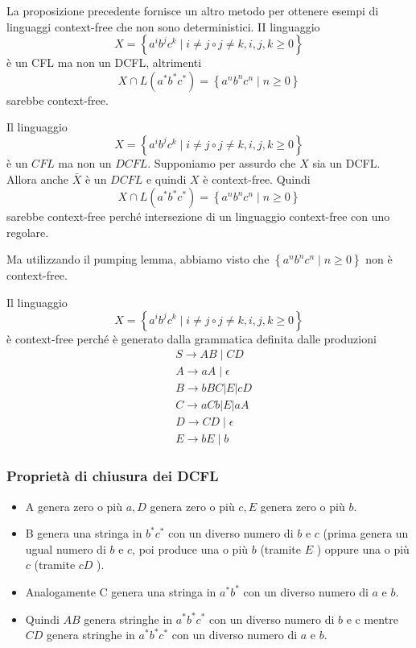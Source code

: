 La proposizione precedente fornisce un altro metodo per ottenere esempi di linguaggi context-free che non sono deterministici.
II linguaggio
$$
X=\left\{a^{i} b^{j} c^{k} \mid i \neq j \circ j \neq k, i, j, k \geq 0\right\}
$$
è un CFL ma non un DCFL, altrimenti
$$
X \cap L\left(a^{*} b^{*} c^{*}\right)=\left\{a^{n} b^{n} c^{n} \mid n \geq 0\right\}
$$
sarebbe context-free.

\vspace{5mm}

Il linguaggio
$$
X=\left\{a^{i} b^{j} c^{k} \mid i \neq j \circ j \neq k, i, j, k \geq 0\right\}
$$
è un $C F L$ ma non un $D C F L$.
Supponiamo per assurdo che $X$ sia un DCFL.
Allora anche $\bar{X}$ è un $D C F L$ e quindi $X$ è context-free.
Quindi
$$
X \cap L\left(a^{*} b^{*} c^{*}\right)=\left\{a^{n} b^{n} c^{n} \mid n \geq 0\right\}
$$
sarebbe context-free perché intersezione di un linguaggio context-free con uno regolare.

Ma utilizzando il pumping lemma, abbiamo visto che $\left\{a^{n} b^{n} c^{n} \mid n \geq 0\right\}$ non è context-free.

\vspace{5mm}

Il linguaggio
$$
X=\left\{a^{i} b^{j} c^{k} \mid i \neq j \circ j \neq k, i, j, k \geq 0\right\}
$$
è context-free perché è generato dalla grammatica definita dalle produzioni
$$
\begin{aligned}
&S \rightarrow A B \mid C D \\
&A \rightarrow a A \mid \epsilon \\
&B \rightarrow b B C|E| c D \\
&C \rightarrow a C b|E| a A \\
&D \rightarrow C D \mid \epsilon \\
&E \rightarrow b E \mid b
\end{aligned}
$$

\subsubsection{Proprietà di chiusura dei DCFL}

\begin{itemize}
    \item A genera zero o più $a, D$ genera zero o più $c, E$ genera zero o più $b$.
    \item B genera una stringa in $b^{*} c^{*}$ con un diverso numero di $b$ e $c$ (prima genera un ugual numero di $b$ e $c$, poi produce una o più $b$ (tramite $E$ ) oppure una o più $c$ (tramite $c D$ ).
    \item Analogamente C genera una stringa in $a^{*} b^{*}$ con un diverso numero di $a$ e $b$.
    \item Quindi $A B$ genera stringhe in $a^{*} b^{*} c^{*}$ con un diverso numero di $b$ e c mentre $C D$ genera stringhe in $a^{*} b^{*} c^{*}$ con un diverso numero di $a$ e $b$.
\end{itemize}

